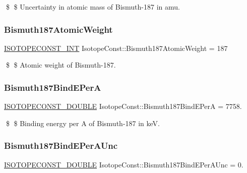 \$ \$ Uncertainty in atomic mass of Bismuth-\/187 in amu. \mbox{\label{group___isotope_const-_bismuth-_bi187_gad133335340a63f2aaf58a6598b7e61e9}} 
\subsubsection{\texorpdfstring{Bismuth187\+Atomic\+Weight}{Bismuth187AtomicWeight}}
{\footnotesize\ttfamily \mbox{\hyperlink{group___isotope_const-_macros_ga5f18360b3e99483a35c32d789e62621c}{I\+S\+O\+T\+O\+P\+E\+C\+O\+N\+S\+T\+\_\+\+I\+NT}} Isotope\+Const\+::\+Bismuth187\+Atomic\+Weight = 187}

\$ \$ Atomic weight of Bismuth-\/187. \mbox{\label{group___isotope_const-_bismuth-_bi187_gab05107dbb9d85c5af3d3001d8681d978}} 
\subsubsection{\texorpdfstring{Bismuth187\+Bind\+E\+PerA}{Bismuth187BindEPerA}}
{\footnotesize\ttfamily \mbox{\hyperlink{group___isotope_const-_macros_ga8f45a7272ce02c0b4c65c44636ed719a}{I\+S\+O\+T\+O\+P\+E\+C\+O\+N\+S\+T\+\_\+\+D\+O\+U\+B\+LE}} Isotope\+Const\+::\+Bismuth187\+Bind\+E\+PerA = 7758.}

\$ \$ Binding energy per A of Bismuth-\/187 in keV. \mbox{\label{group___isotope_const-_bismuth-_bi187_ga8a50c2714817129fd4f49e072935c702}} 
\subsubsection{\texorpdfstring{Bismuth187\+Bind\+E\+Per\+A\+Unc}{Bismuth187BindEPerAUnc}}
{\footnotesize\ttfamily \mbox{\hyperlink{group___isotope_const-_macros_ga8f45a7272ce02c0b4c65c44636ed719a}{I\+S\+O\+T\+O\+P\+E\+C\+O\+N\+S\+T\+\_\+\+D\+O\+U\+B\+LE}} Isotope\+Const\+::\+Bismuth187\+Bind\+E\+Per\+A\+Unc = 0.}

